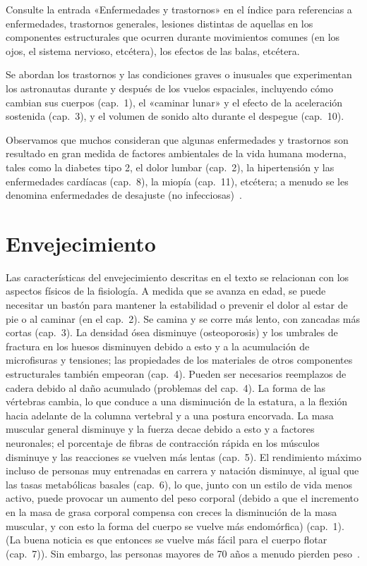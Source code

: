 \documentclass[12pt,a4paper]{book}
\begin{document}
Consulte la entrada «Enfermedades y trastornos» en el índice para referencias a enfermedades, trastornos generales, lesiones distintas de aquellas en los componentes estructurales que ocurren durante movimientos comunes (en los ojos, el sistema nervioso, etcétera), los efectos de las balas, etcétera.

Se abordan los trastornos y las condiciones graves o inusuales que experimentan los astronautas durante y después de los vuelos espaciales, incluyendo cómo cambian sus cuerpos (cap.~1), el «caminar lunar» y el efecto de la aceleración sostenida (cap.~3), y el volumen de sonido alto durante el despegue (cap.~10).

Observamos que muchos consideran que algunas enfermedades y trastornos son resultado en gran medida de factores ambientales de la vida humana moderna, tales como la diabetes tipo 2, el dolor lumbar (cap.~2), la hipertensión y las enfermedades cardíacas (cap.~8), la miopía (cap.~11), etcétera; a menudo se les denomina enfermedades de desajuste (no infecciosas)~\cite{f7}.

\section{Envejecimiento}
\label{sec:f4}

Las características del envejecimiento descritas en el texto se relacionan con los aspectos físicos de la fisiología. A medida que se avanza en edad, se puede necesitar un bastón para mantener la estabilidad o prevenir el dolor al estar de pie o al caminar (en el cap.~2). Se camina y se corre más lento, con zancadas más cortas (cap.~3). La densidad ósea disminuye (osteoporosis) y los umbrales de fractura en los huesos disminuyen debido a esto y a la acumulación de microfisuras y tensiones; las propiedades de los materiales de otros componentes estructurales también empeoran (cap.~4). Pueden ser necesarios reemplazos de cadera debido al daño acumulado (problemas del cap.~4). La forma de las vértebras cambia, lo que conduce a una disminución de la estatura, a la flexión hacia adelante de la columna vertebral y a una postura encorvada. La masa muscular general disminuye y la fuerza decae debido a esto y a factores neuronales; el porcentaje de fibras de contracción rápida en los músculos disminuye y las reacciones se vuelven más lentas (cap.~5). El rendimiento máximo incluso de personas muy entrenadas en carrera y natación disminuye, al igual que las tasas metabólicas basales (cap.~6), lo que, junto con un estilo de vida menos activo, puede provocar un aumento del peso corporal (debido a que el incremento en la masa de grasa corporal compensa con creces la disminución de la masa muscular, y con esto la forma del cuerpo se vuelve más endomórfica) (cap.~1). (La buena noticia es que entonces se vuelve más fácil para el cuerpo flotar (cap.~7)). Sin embargo, las personas mayores de 70 años a menudo pierden peso~\cite{f17}.
\end{document}

